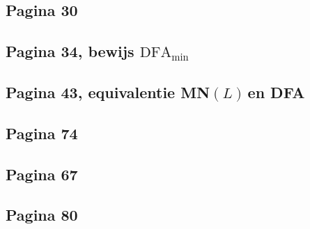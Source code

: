 \documentclass[kulak]{kulakarticle}
\newcommand{\DFA}{\text{DFA}}
\newcommand{\mnl}{MN\((L)\)}
\theoremstyle{definition}
\begin{document}
	

	\subsection*{Pagina 30}

	

	\newpage
	\subsection*{Pagina 34, bewijs \( \DFA_{\text{min}} \)}

	

	\newpage
	\subsection*{Pagina 43, equivalentie \mnl \,en DFA}

	

	\subsection*{Pagina 74}

	

	\subsection*{Pagina 67}

	

	\newpage
	\subsection*{Pagina 80}

	
\end{document}
